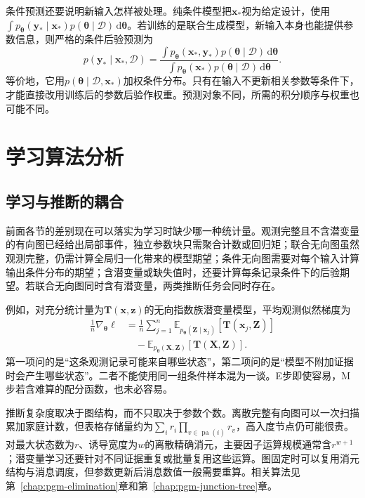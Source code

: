 条件预测还要说明新输入怎样被处理。纯条件模型把$\bm{x}_*$视为给定设计，使用$\int p_{\bm{\theta}}(\bm{y}_*\mid\bm{x}_*)p(\bm{\theta}\mid\mathcal{D})\,\mathrm{d}\bm{\theta}$。若训练的是联合生成模型，新输入本身也能提供参数信息，则严格的条件后验预测为
\[
  p(\bm{y}_*\mid\bm{x}_*,\mathcal{D})
  =\frac{\int p_{\bm{\theta}}(\bm{x}_*,\bm{y}_*)
                      p(\bm{\theta}\mid\mathcal{D})\,\mathrm{d}\bm{\theta}}
         {\int p_{\bm{\theta}}(\bm{x}_*)
                      p(\bm{\theta}\mid\mathcal{D})\,\mathrm{d}\bm{\theta}}.
\]
等价地，它用$p(\bm{\theta}\mid\mathcal{D},\bm{x}_*)$加权条件分布。只有在输入不更新相关参数等条件下，才能直接改用训练后的参数后验作权重。预测对象不同，所需的积分顺序与权重也可能不同。

\section{学习算法分析}
\label{sec:pgm-parameter-learning-analysis}

\subsection{学习与推断的耦合}
\label{sec:pgm-parameter-learning-inference-coupling}

前面各节的差别现在可以落实为学习时缺少哪一种统计量。观测完整且不含潜变量的有向图已经给出局部事件，独立参数块只需聚合计数或回归矩；联合无向图虽然观测完整，仍需计算全局归一化带来的模型期望；条件无向图需要对每个输入计算输出条件分布的期望；含潜变量或缺失值时，还要计算每条记录条件下的后验期望。若联合无向图同时含有潜变量，两类推断任务会同时存在。

例如，对充分统计量为$\bm{T}(\bm{x},\bm{z})$的无向指数族潜变量模型，平均观测似然梯度为
\begin{equation}
  \begin{aligned}
    \frac{1}{n}\nabla_{\bm{\theta}}\ell
      &=\frac{1}{n}\sum_{j=1}^n
        \mathbb{E}_{p_{\bm{\theta}}(\bm{Z}\mid\bm{x}_j)}
          [\bm{T}(\bm{x}_j,\bm{Z})]\\
      &\quad-\mathbb{E}_{p_{\bm{\theta}}(\bm{X},\bm{Z})}
          [\bm{T}(\bm{X},\bm{Z})].
  \end{aligned}
  \label{eq:pgm-parameter-learning-two-expectations}
\end{equation}
第一项问的是“这条观测记录可能来自哪些状态”，第二项问的是“模型不附加证据时会产生哪些状态”。二者不能使用同一组条件样本混为一谈。E步即使容易，M步若含难算的配分函数，也未必容易。

推断复杂度取决于图结构，而不只取决于参数个数。离散完整有向图可以一次扫描累加家庭计数，但表格存储量约为$\sum_i r_i\prod_{v\in\operatorname{pa}(i)}r_v$，高入度节点仍可能很贵。对最大状态数为$r$、诱导宽度为$w$的离散精确消元，主要因子运算规模通常含$r^{w+1}$；潜变量学习还要针对不同证据重复或批量复用这些运算。图固定时可以复用消元结构与消息调度，但参数更新后消息数值一般需要重算。相关算法见第~\ref{chap:pgm-elimination}章和第~\ref{chap:pgm-junction-tree}章。

